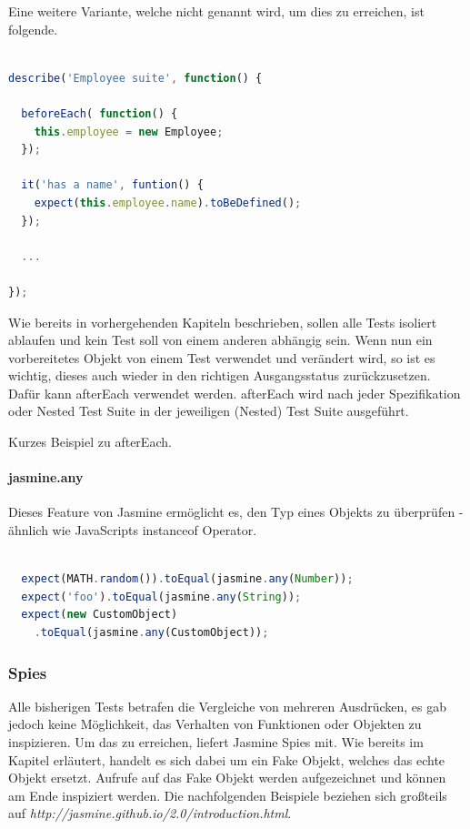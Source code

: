 Eine weitere Variante, welche nicht genannt wird, um dies zu erreichen, ist folgende.

\begin{lstlisting}[language=JavaScript]

describe('Employee suite', function() {

  beforeEach( function() {
    this.employee = new Employee;
  });

  it('has a name', funtion() {
    expect(this.employee.name).toBeDefined();
  });

  ...

});
\end{lstlisting}

Wie bereits in vorhergehenden Kapiteln beschrieben, sollen alle Tests isoliert ablaufen und kein Test soll von einem anderen abhängig sein. Wenn nun ein vorbereitetes Objekt von einem Test verwendet und verändert wird, so ist es wichtig, dieses auch wieder in den richtigen Ausgangsstatus zurückzusetzen. Dafür kann afterEach verwendet werden. afterEach wird nach jeder Spezifikation oder Nested Test Suite in der jeweiligen (Nested) Test Suite ausgeführt.

Kurzes Beispiel zu afterEach.

\paragraph{jasmine.any}
Dieses Feature von Jasmine ermöglicht es, den Typ eines Objekts zu überprüfen - ähnlich wie JavaScripts instanceof Operator.
\begin{lstlisting}[language=JavaScript]

  expect(MATH.random()).toEqual(jasmine.any(Number));
  expect('foo').toEqual(jasmine.any(String));
  expect(new CustomObject)
    .toEqual(jasmine.any(CustomObject));

\end{lstlisting}


\subsubsection{Spies}
Alle bisherigen Tests betrafen die Vergleiche von mehreren Ausdrücken, es gab jedoch keine Möglichkeit, das Verhalten von Funktionen oder Objekten zu inspizieren. Um das zu erreichen, liefert Jasmine Spies mit. Wie bereits im Kapitel  erläutert, handelt es sich dabei um ein Fake Objekt, welches das echte Objekt ersetzt. Aufrufe auf das Fake Objekt werden aufgezeichnet und können am Ende inspiziert werden. Die nachfolgenden Beispiele beziehen sich großteils auf \textit{http://jasmine.github.io/2.0/introduction.html}.

